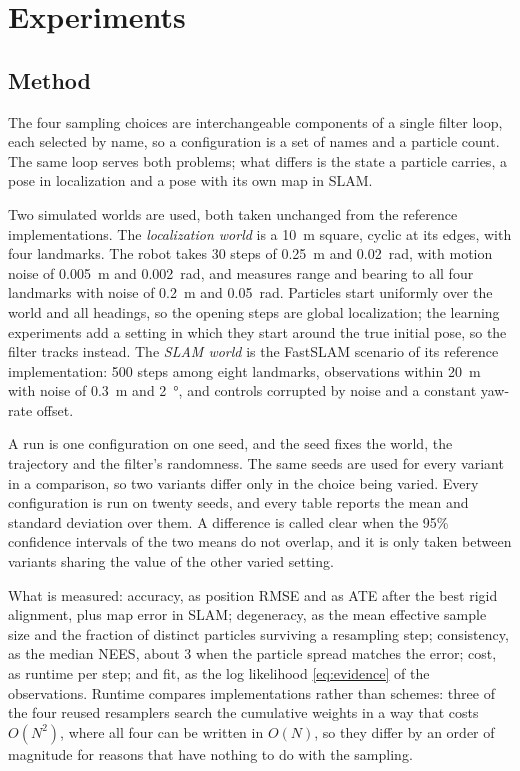 \section{Experiments}\label{sec:experiments}

\subsection{Method}\label{sec:method}

The four sampling choices are interchangeable components of a single filter loop, each selected by name, so a
configuration is a set of names and a particle count. The same loop serves both problems; what differs is the
state a particle carries, a pose in localization and a pose with its own map in SLAM.

Two simulated worlds are used, both taken unchanged from the reference implementations. The \emph{localization
world} is a \SI{10}{\meter} square, cyclic at its edges, with four landmarks. The robot takes 30 steps of
\SI{0.25}{\meter} and \SI{0.02}{\radian}, with motion noise of \SI{0.005}{\meter} and \SI{0.002}{\radian}, and
measures range and bearing to all four landmarks with noise of \SI{0.2}{\meter} and \SI{0.05}{\radian}.
Particles start uniformly over the world and all headings, so the opening steps are global localization; the
learning experiments add a setting in which they start around the true initial pose, so the filter tracks
instead. The \emph{SLAM world} is the FastSLAM scenario of its reference implementation: 500 steps among eight
landmarks, observations within \SI{20}{\meter} with noise of \SI{0.3}{\meter} and \SI{2}{\degree}, and controls
corrupted by noise and a constant yaw-rate offset.

A run is one configuration on one seed, and the seed fixes the world, the trajectory and the filter's randomness.
The same seeds are used for every variant in a comparison, so two variants differ only in the choice being
varied. Every configuration is run on twenty seeds, and every table reports the mean and standard deviation over
them. A difference is called clear when the 95\% confidence intervals of the two means do not overlap, and it is
only taken between variants sharing the value of the other varied setting.

What is measured: accuracy, as position RMSE and as ATE after the best rigid alignment, plus map error in SLAM;
degeneracy, as the mean effective sample size and the fraction of distinct particles surviving a resampling step;
consistency, as the median NEES, about 3 when the particle spread matches the error; cost, as runtime per step;
and fit, as the log likelihood \eqref{eq:evidence} of the observations. Runtime compares implementations rather
than schemes: three of the four reused resamplers search the cumulative weights in a way that costs $O(N^2)$,
where all four can be written in $O(N)$, so they differ by an order of magnitude for reasons that have nothing
to do with the sampling.

